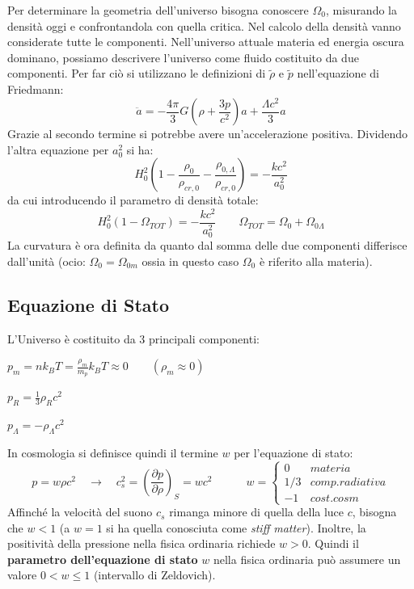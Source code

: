 Per determinare la geometria dell'universo bisogna conoscere $\Omega_0$, misurando la densità oggi e confrontandola con quella critica. Nel calcolo della densità vanno considerate tutte le componenti.
Nell'universo attuale materia ed energia oscura dominano, possiamo descrivere l'universo come fluido costituito da due componenti. Per far ciò si utilizzano le definizioni di $\tilde{\rho}$ e $\tilde{p}$ nell'equazione di Friedmann:
$$
\ddot{a}  =-\frac{4\pi}{3}G\left ( \rho+\frac{3p}{c^2} \right ) a + \frac{\Lambda c^2}{3}a
$$
Grazie al secondo termine si potrebbe avere un'accelerazione positiva.
Dividendo l'altra equazione per $a_0^2$  si ha:
\begin{equation}
    H_0^2 \left ( 1-\frac{\rho_0}{\rho_{cr,0}} -\frac{\rho_{0,\Lambda}}{\rho_{cr,0}} \right ) = -\frac{kc^2}{a_0^2}
\end{equation}
da cui introducendo il parametro di densità totale:
\begin{equation}
    H_0^2 \left ( 1-\Omega_{TOT} \right ) = -\frac{kc^2}{a_0^2}\qquad \Omega_{TOT}=\Omega_{0}+\Omega_{0\Lambda}
\end{equation}
La curvatura è ora definita da quanto dal somma delle due componenti differisce dall'unità (ocio: $\Omega_0 = \Omega_{0m}$ ossia in questo caso $\Omega_0$ è riferito alla materia). 


\subsection{Equazione di Stato}
L'Universo è costituito da 3 principali componenti:

\begin{example}
$p_m=nk_B T = \frac{\rho_m}{m_p}k_B T \approx 0 \qquad ( \rho_m \approx 0) $
\end{example}
\begin{example}
$p_R=\frac{1}{3} \rho_R c^2 $
\end{example}
\begin{example}
$p_\Lambda= -\rho_\Lambda c^2 $
\end{example}

In cosmologia si definisce quindi il termine $w$ per l'equazione di stato:
\begin{equation}
    p=w\rho c^2\quad\rightarrow \quad c_s^2=\left ( \frac{\partial p}{\partial \rho}\right )_{S}=wc^2 \qquad \quad w= \left\{\begin{matrix}
0& materia\\
1/3 & comp. radiativa\\
-1 & cost. cosm
\end{matrix}\right.
\end{equation}
Affinché la velocità del suono $c_s$ rimanga minore di quella della luce $c$, bisogna che $w<1 $ (a $w=1 $ si ha quella conosciuta come \textit{stiff matter}). Inoltre, la positività della pressione nella fisica ordinaria richiede $w>0 $. Quindi il \textbf{parametro dell'equazione di stato} $w $ nella fisica ordinaria può assumere un valore $0<w\leq 1$ (intervallo di Zeldovich).

